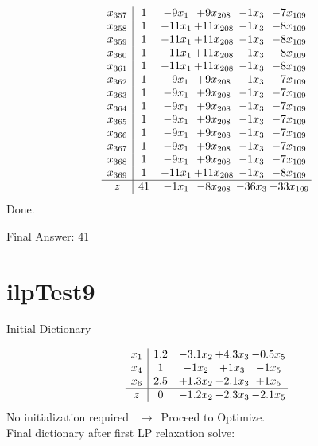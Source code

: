 \documentclass[11pt]{article}
\begin{document}
\[\begin{array}{c| c c@{\hskip 2pt} c@{\hskip 2pt} c@{\hskip 2pt} c@{\hskip 2pt} }
 x_{357}   &  1 & -9 x_{1} & + 9 x_{208} & -1 x_{3} & -7 x_{109}\\
 x_{358}   &  1 & -11 x_{1} & + 11 x_{208} & -1 x_{3} & -8 x_{109}\\
 x_{359}   &  1 & -11 x_{1} & + 11 x_{208} & -1 x_{3} & -8 x_{109}\\
 x_{360}   &  1 & -11 x_{1} & + 11 x_{208} & -1 x_{3} & -8 x_{109}\\
 x_{361}   &  1 & -11 x_{1} & + 11 x_{208} & -1 x_{3} & -8 x_{109}\\
 x_{362}   &  1 & -9 x_{1} & + 9 x_{208} & -1 x_{3} & -7 x_{109}\\
 x_{363}   &  1 & -9 x_{1} & + 9 x_{208} & -1 x_{3} & -7 x_{109}\\
 x_{364}   &  1 & -9 x_{1} & + 9 x_{208} & -1 x_{3} & -7 x_{109}\\
 x_{365}   &  1 & -9 x_{1} & + 9 x_{208} & -1 x_{3} & -7 x_{109}\\
 x_{366}   &  1 & -9 x_{1} & + 9 x_{208} & -1 x_{3} & -7 x_{109}\\
 x_{367}   &  1 & -9 x_{1} & + 9 x_{208} & -1 x_{3} & -7 x_{109}\\
 x_{368}   &  1 & -9 x_{1} & + 9 x_{208} & -1 x_{3} & -7 x_{109}\\
 x_{369}   &  1 & -11 x_{1} & + 11 x_{208} & -1 x_{3} & -8 x_{109}\\
\hline
z    &  41 & -1 x_{1} & -8 x_{208} & -36 x_{3} & -33 x_{109}\\
\end{array}\]
Done.

Final Answer: 41

\section{ilpTest9}

Initial Dictionary 

\[\begin{array}{c| c c@{\hskip 2pt} c@{\hskip 2pt} c@{\hskip 2pt} }
 x_{1}   &  1.2 & -3.1 x_{2} & + 4.3 x_{3} & -0.5 x_{5}\\
 x_{4}   &  1 & -1 x_{2} & + 1 x_{3} & -1 x_{5}\\
 x_{6}   &  2.5 & + 1.3 x_{2} & -2.1 x_{3} & + 1 x_{5}\\
\hline
z    &  0 & -1.2 x_{2} & -2.3 x_{3} & -2.1 x_{5}\\
\end{array}\]
No initialization required \ $\rightarrow$\  Proceed to Optimize. \\ 
Final dictionary after first LP relaxation solve: 
\end{document}
